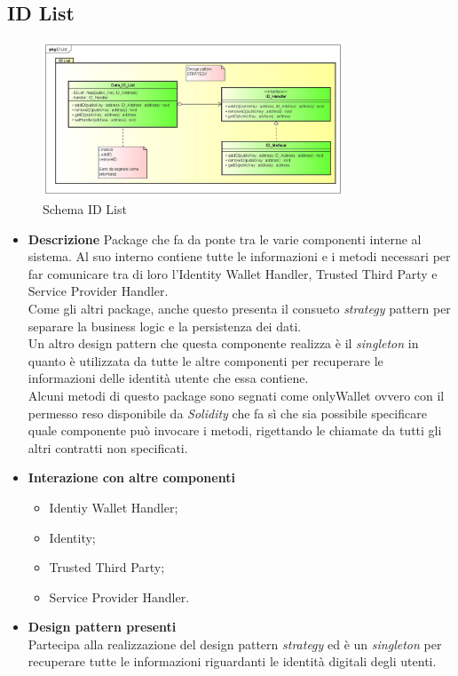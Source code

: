 \subsection{ID List}
\begin{figure}[!h]
	\centering
	\includegraphics[width=0.8\textwidth]{immagini/idList}
	\caption{Schema ID List}
\end{figure}
\begin{itemize}
	\item \textbf{Descrizione}
	Package che fa da ponte tra le varie componenti interne al sistema. 
	Al suo interno contiene tutte le informazioni e i metodi necessari per far comunicare tra di loro l'Identity Wallet Handler, Trusted Third Party e Service Provider Handler.\\
	Come gli altri package, anche questo presenta il consueto \textit{strategy} pattern per separare la business logic e la persistenza dei dati.\\
	Un altro design pattern che questa componente realizza è il \textit{singleton} in quanto è utilizzata da tutte le altre componenti per recuperare le informazioni delle identità utente che essa contiene.\\
	Alcuni metodi di questo package sono segnati come onlyWallet ovvero con il permesso reso disponibile da \textit{Solidity} che fa sì che sia possibile specificare quale componente può invocare i metodi, rigettando le chiamate da tutti gli altri contratti non specificati.
	\item \textbf{Interazione con altre componenti}
	\begin{itemize}
		\item Identiy Wallet Handler;
		\item Identity;
		\item Trusted Third Party;
		\item Service Provider Handler.
	\end{itemize}
	\item \textbf{Design pattern presenti}\\
	Partecipa alla realizzazione del design pattern \textit{strategy} ed è un \textit{singleton} per recuperare tutte le informazioni riguardanti le identità digitali degli utenti.
\end{itemize}
